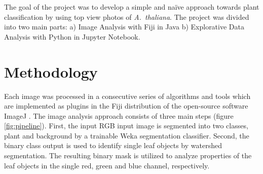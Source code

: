 \documentclass[paper=A4,bibliography=totocnumbered]{scrartcl}
\begin{document}
The goal of the project was to develop a simple and naïve approach towards plant classification by using top view photos of  \textit{A.~thaliana}. The project was divided into two main parts:
a) Image Analysis with Fiji in Java
b) Explorative Data Analysis with Python in Jupyter Notebook.

\section{Methodology}
Each image was processed in a consecutive series of algorithms and tools which are implemented as plugins in the Fiji distribution \citep{Schindelin.2012} of the open-source software ImageJ \citep{Rueden.2017}. The image analysis approach consists of three main steps (figure \ref{fig:pipeline}). First, the input RGB input image is segmented into two classes, plant and background by a trainable Weka segmentation classifier. Second, the binary class output is used to identify single leaf objects by watershed segmentation. The resulting binary mask is utilized to analyze properties of the leaf objects in the single red, green and blue channel, respectively.
\end{document}
